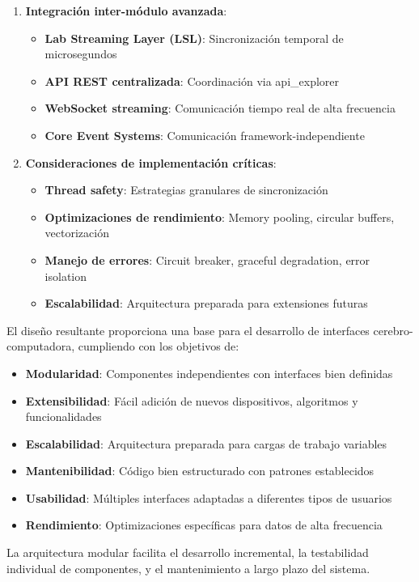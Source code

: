 \begin{enumerate}
    \item \textbf{Integración inter-módulo avanzada}:
    \begin{itemize}
        \item \textbf{Lab Streaming Layer (LSL)}: Sincronización temporal de microsegundos
        \item \textbf{API REST centralizada}: Coordinación via api\_explorer
        \item \textbf{WebSocket streaming}: Comunicación tiempo real de alta frecuencia
        \item \textbf{Core Event Systems}: Comunicación framework-independiente
    \end{itemize}

    \item \textbf{Consideraciones de implementación críticas}:
    \begin{itemize}
        \item \textbf{Thread safety}: Estrategias granulares de sincronización
        \item \textbf{Optimizaciones de rendimiento}: Memory pooling, circular buffers, vectorización
        \item \textbf{Manejo de errores}: Circuit breaker, graceful degradation, error isolation
        \item \textbf{Escalabilidad}: Arquitectura preparada para extensiones futuras
    \end{itemize}
\end{enumerate}

El diseño resultante proporciona una base para el desarrollo de interfaces cerebro-computadora, cumpliendo con los objetivos de:

\begin{itemize}
    \item \textbf{Modularidad}: Componentes independientes con interfaces bien definidas
    \item \textbf{Extensibilidad}: Fácil adición de nuevos dispositivos, algoritmos y funcionalidades
    \item \textbf{Escalabilidad}: Arquitectura preparada para cargas de trabajo variables
    \item \textbf{Mantenibilidad}: Código bien estructurado con patrones establecidos
    \item \textbf{Usabilidad}: Múltiples interfaces adaptadas a diferentes tipos de usuarios
    \item \textbf{Rendimiento}: Optimizaciones específicas para datos de alta frecuencia
\end{itemize}

La arquitectura modular facilita el desarrollo incremental, la testabilidad individual de componentes, y el mantenimiento a largo plazo del sistema.
